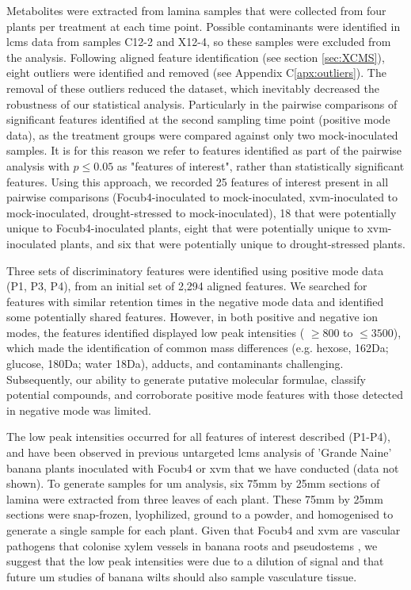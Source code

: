 \bigskip
\noindent
Metabolites were extracted from lamina samples that were collected from four plants per treatment at each time point. Possible contaminants were identified in \ac{lcms} data from samples C12-2 and X12-4, so these samples were excluded from the analysis. Following aligned feature identification (see section \ref{sec:XCMS}), eight outliers were identified and removed (see Appendix C\ref{apx:outliers}). The removal of these outliers reduced the dataset, which inevitably decreased the robustness of our statistical analysis. Particularly in the pairwise comparisons of significant features identified at the second sampling time point (positive mode data), as the treatment groups were compared against only two mock-inoculated samples. It is for this reason we refer to features identified as part of the pairwise analysis with $p \le 0.05$ as "features of interest", rather than statistically significant features. Using this approach, we recorded 25 features of interest present in all pairwise comparisons (\ac{Focub4}-inoculated to mock-inoculated, \ac{xvm}-inoculated to mock-inoculated, drought-stressed to mock-inoculated), 18 that were potentially unique to \ac{Focub4}-inoculated plants, eight that were potentially unique to \ac{xvm}-inoculated plants, and six that were potentially unique to drought-stressed plants. 

Three sets of discriminatory features were identified using positive mode data (P1, P3, P4), from an initial set of 2,294 aligned features. We searched for features with similar retention times in the negative mode data and identified some potentially shared features. However, in both positive and negative ion modes, the features identified displayed low peak intensities ( $\geq800$ to $\leq3500$), which made the identification of common mass differences (e.g. hexose, 162Da; glucose, 180Da; water 18Da), adducts, and contaminants challenging. Subsequently, our ability to generate putative molecular formulae, classify potential compounds, and corroborate positive mode features with those detected in negative mode was limited. 

The low peak intensities occurred for all features of interest described (P1-P4), and have been observed in previous untargeted \ac{lcms} analysis of 'Grande Naine' banana plants inoculated with \ac{Focub4} or \ac{xvm} that we have conducted (data not shown). To generate samples for \ac{um} analysis, six 75mm by 25mm sections of lamina were extracted from three leaves of each plant. These 75mm by 25mm sections were snap-frozen, lyophilized, ground to a powder, and homogenised to generate a single sample for each plant. Given that \ac{Focub4} and \ac{xvm} are vascular pathogens that colonise xylem vessels in banana roots and pseudostems \parencite{Li2011, Pegg2019}, we suggest that the low peak intensities were due to a dilution of signal and that future \ac{um} studies of banana wilts should also sample vasculature tissue. 

